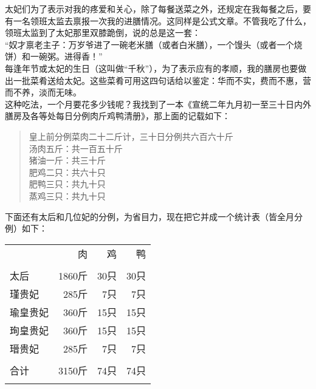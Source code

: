 太妃们为了表示对我的疼爱和关心，除了每餐送菜之外，还规定在我每餐之后，要有一名领班太监去禀报一次我的进膳情况。这同样是公式文章。不管我吃了什么，领班太监到了太妃那里双膝跪倒，说的总是这一套：\\

“奴才禀老主子：万岁爷进了一碗老米膳（或者白米膳），一个馒头（或者一个烧饼）和一碗粥。进得香！”\\

每逢年节或太妃的生日（这叫做“千秋”），为了表示应有的孝顺，我的膳房也要做出一批菜肴送给太妃。这些菜肴可用这四句话给以鉴定：华而不实，费而不惠，营而不养，淡而无味。\\

这种吃法，一个月要花多少钱呢？我找到了一本《宣统二年九月初一至三十日内外膳房及各等处每日分例肉斤鸡鸭清册》，那上面的记载如下：\\

\begin{quote}
	皇上前分例菜肉二十二斤计，三十日分例共六百六十斤\\

汤肉五斤：共一百五十斤\\

猪油一斤：共三十斤\\

肥鸡二只：共六十只\\

肥鸭三只：共九十只\\

蒸鸡三只：共九十只\\
\end{quote}

下面还有太后和几位妃的分例，为省目力，现在把它并成一个统计表（皆全月分例）如下：\\

\begin{center}
	\begin{tabular}{ l r r  r}
		& 肉& 鸡& 鸭\\
				&&&\\
		太后 &1860斤&   30只&  30只\\
		瑾贵妃&285斤&7只&   7只\\
		瑜皇贵妃&360斤&15只&  15只\\
		珣皇贵妃&360斤&15只&  15只\\
		瑨贵妃&285斤&7只&   7只\\
				&&&\\
		合计& 3150斤& 74只& 74只\\
		&&&\\
	\end{tabular}
\end{center}

